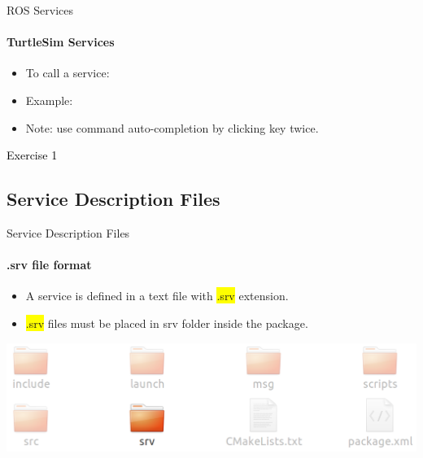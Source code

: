 \documentclass{beamer}
\begin{document}
\begin{frame}{ROS Services}
    \framesubtitle{TurtleSim Services}
    \begin{itemize}
        \item To call a service:
        \begin{terminal}
            \color{green} 
        \end{terminal} 
        
        \item Example:         
    \end{itemize}
            \begin{terminal}
                \color{green} 
            \end{terminal} 
            
            \begin{itemize}
                \item Note: use command auto-completion by clicking  key twice.
            \end{itemize}
\end{frame}

\begin{frame}[plain]{}  
    \centering
    {\huge \textcolor{black}{Exercise 1}}
\end{frame}
    
\subsection{Service Description Files}

\begin{frame}{Service Description Files}
\framesubtitle{.srv file format}
\begin{itemize}
    \item A service is defined in a text file with  {\ttfamily \colorbox{yellow}{.srv}} extension.
    \item {\ttfamily \colorbox{yellow}{.srv}} files  must be placed in {\ttfamily \colorbox{gray!30!white}{srv}} folder inside the package.
\end{itemize}
\vspace{5mm}
\includegraphics[width=1\linewidth]{figures/package.png}
\end{frame}
\end{document}
